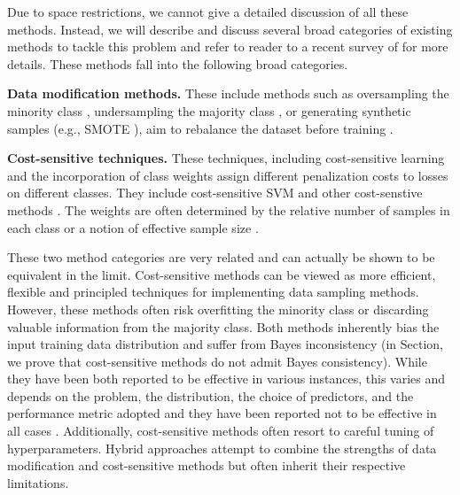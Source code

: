 Due to space restrictions, we
cannot give a detailed discussion of all these methods. Instead, we
will describe and discuss several broad categories of existing methods
to tackle this problem and refer to reader to a recent survey of
\citet{ZhangKangHooiYanFeng2023} for more details.
%
These methods fall into the following broad categories.

\textbf{Data modification methods.} These include methods such as
oversampling the minority class \citep{chawla2002smote}, undersampling
the majority class
\citep{WallaceSmallBrodleyTrikalinos2011,KubatMatwin1997}, or
generating synthetic samples (e.g., SMOTE
\citep{chawla2002smote,QiaoLiu2008,han2005borderline}), aim to
rebalance the dataset before training
\citep{chawla2002smote,estabrooks2004multiple,
  liu2008exploratory,zhang2021learning,shi2023re}.

\textbf{Cost-sensitive techniques.} These techniques, including
cost-sensitive learning and the incorporation of class weights assign
different penalization costs to losses on different classes. They
include cost-sensitive SVM \citep{Iranmehr:2019,Masnadi-Shirazi:2010}
and other cost-senstive methods
\citep{elkan2001foundations,zhou2005training, zhao2018adaptive,
  zhang2018online, zhang2019online,sun2007cost,Fan:2017,
  jamal2020rethinking,zhang2022self,wang2022solar,xiao2024fed,suh2023long}. The weights are often determined by the
relative number of samples in each class or a notion of effective
sample size \cite{cui2019class}.

These two method categories are very related and can actually be shown
to be equivalent in the limit.  Cost-sensitive methods can be viewed
as more efficient, flexible and principled techniques for implementing
data sampling methods.  However, these methods often risk overfitting
the minority class or discarding valuable information from the
majority class.  Both methods inherently bias the input training data
distribution and suffer from Bayes inconsistency (in Section, we prove
that cost-sensitive methods do not admit Bayes consistency). While
they have been both reported to be effective in various instances,
this varies and depends on the problem, the distribution, the choice
of predictors, and the performance metric adopted and they have been
reported not to be effective in all cases \citep{VanHulse:2007}.
Additionally, cost-sensitive methods often resort to careful tuning of
hyperparameters.  Hybrid approaches attempt to combine the strengths
of data modification and cost-sensitive methods but often inherit
their respective limitations.

